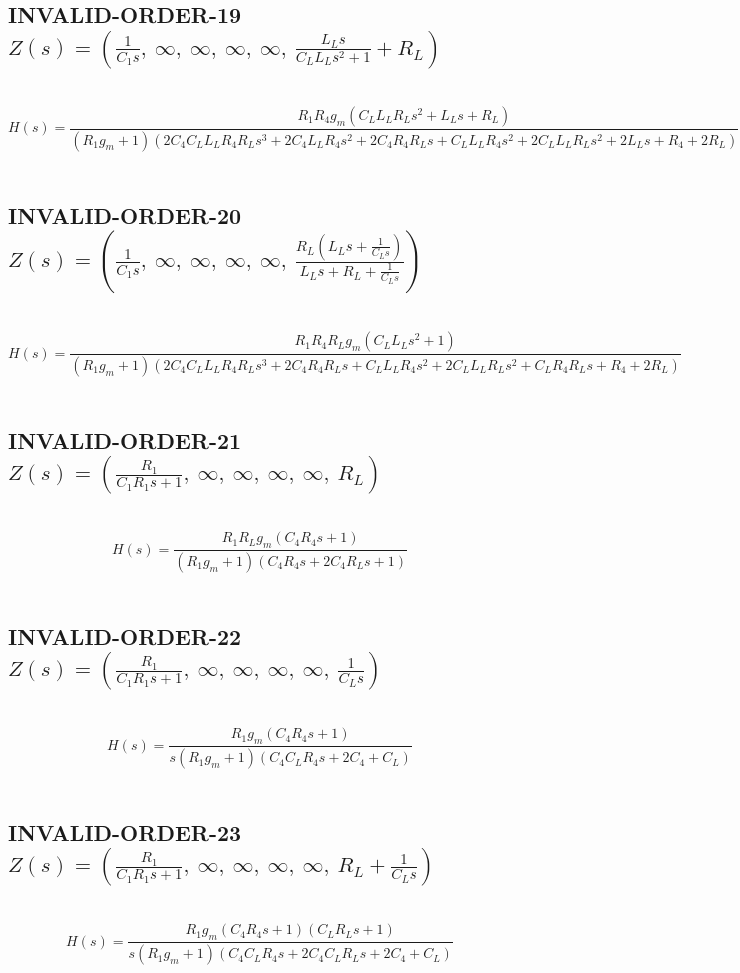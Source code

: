 \documentclass{article}
\begin{document}
\subsection{INVALID-ORDER-19 $Z(s) = \left( \frac{1}{C_{1} s}, \  \infty, \  \infty, \  \infty, \  \infty, \  \frac{L_{L} s}{C_{L} L_{L} s^{2} + 1} + R_{L}\right)$ } \ 
\textbf{\[H(s) = \frac{R_{1} R_{4} g_{m} \left(C_{L} L_{L} R_{L} s^{2} + L_{L} s + R_{L}\right)}{\left(R_{1} g_{m} + 1\right) \left(2 C_{4} C_{L} L_{L} R_{4} R_{L} s^{3} + 2 C_{4} L_{L} R_{4} s^{2} + 2 C_{4} R_{4} R_{L} s + C_{L} L_{L} R_{4} s^{2} + 2 C_{L} L_{L} R_{L} s^{2} + 2 L_{L} s + R_{4} + 2 R_{L}\right)}\] } \ 
\subsection{INVALID-ORDER-20 $Z(s) = \left( \frac{1}{C_{1} s}, \  \infty, \  \infty, \  \infty, \  \infty, \  \frac{R_{L} \left(L_{L} s + \frac{1}{C_{L} s}\right)}{L_{L} s + R_{L} + \frac{1}{C_{L} s}}\right)$ } \ 
\textbf{\[H(s) = \frac{R_{1} R_{4} R_{L} g_{m} \left(C_{L} L_{L} s^{2} + 1\right)}{\left(R_{1} g_{m} + 1\right) \left(2 C_{4} C_{L} L_{L} R_{4} R_{L} s^{3} + 2 C_{4} R_{4} R_{L} s + C_{L} L_{L} R_{4} s^{2} + 2 C_{L} L_{L} R_{L} s^{2} + C_{L} R_{4} R_{L} s + R_{4} + 2 R_{L}\right)}\] } \ 
\subsection{INVALID-ORDER-21 $Z(s) = \left( \frac{R_{1}}{C_{1} R_{1} s + 1}, \  \infty, \  \infty, \  \infty, \  \infty, \  R_{L}\right)$ } \ 
\textbf{\[H(s) = \frac{R_{1} R_{L} g_{m} \left(C_{4} R_{4} s + 1\right)}{\left(R_{1} g_{m} + 1\right) \left(C_{4} R_{4} s + 2 C_{4} R_{L} s + 1\right)}\] } \ 
\subsection{INVALID-ORDER-22 $Z(s) = \left( \frac{R_{1}}{C_{1} R_{1} s + 1}, \  \infty, \  \infty, \  \infty, \  \infty, \  \frac{1}{C_{L} s}\right)$ } \ 
\textbf{\[H(s) = \frac{R_{1} g_{m} \left(C_{4} R_{4} s + 1\right)}{s \left(R_{1} g_{m} + 1\right) \left(C_{4} C_{L} R_{4} s + 2 C_{4} + C_{L}\right)}\] } \ 
\subsection{INVALID-ORDER-23 $Z(s) = \left( \frac{R_{1}}{C_{1} R_{1} s + 1}, \  \infty, \  \infty, \  \infty, \  \infty, \  R_{L} + \frac{1}{C_{L} s}\right)$ } \ 
\textbf{\[H(s) = \frac{R_{1} g_{m} \left(C_{4} R_{4} s + 1\right) \left(C_{L} R_{L} s + 1\right)}{s \left(R_{1} g_{m} + 1\right) \left(C_{4} C_{L} R_{4} s + 2 C_{4} C_{L} R_{L} s + 2 C_{4} + C_{L}\right)}\] } \ 
\end{document}
